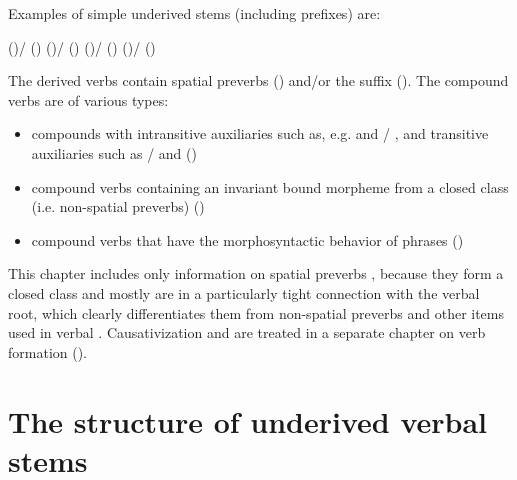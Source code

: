 Examples of simple underived stems (including  prefixes) are:

\begin{exe}
	\ex	\label{ex:underived verbs verbs}
	\begin{xlist}
		\ex	 {} ()\slash{} () 
		\ex	{} ()\slash{} () 
		\ex	{} 
		\ex	{} ()\slash{} () 
		\ex	{} ()\slash{} () 
	\end{xlist}
\end{exe}

The derived verbs contain spatial preverbs () and\slash or the  suffix (). The compound verbs are of various types:

\begin{itemize}
	\item	{} compounds with intransitive auxiliaries such as, e.g.   and \slash{} , and transitive auxiliaries such as \slash{}  and   ()
	\item	{}compound verbs containing an invariant bound morpheme from a closed class (i.e. non-spatial preverbs) ()
	\item	{}compound verbs that have the morphosyntactic behavior of phrases ()
\end{itemize}

This chapter includes only information on spatial preverbs , because they form a closed class and mostly are in a particularly tight connection with the verbal root, which clearly differentiates them from non-spatial preverbs and other items used in verbal . Causativization and  are treated in a separate chapter on verb formation ().


\section{The structure of underived verbal stems}
\label{sec:The structure underived verbal stems}

